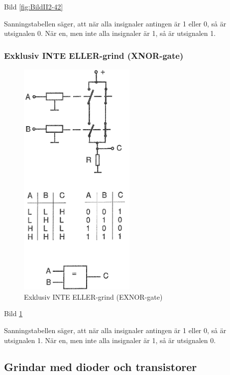 Bild \ref{fig:BildII2-42}

Sanningstabellen säger, att när alla insignaler antingen är 1 eller 0, så är
utsignalen 0. När en, men inte alla insignaler är 1, så är utsignalen 1.

\subsubsection{Exklusiv INTE ELLER-grind (XNOR-gate)}

\begin{figure}
\includegraphics[width=0.5\textwidth]{images/cropped_pdfs/bild_2_2-43.pdf}
\caption{Exklusiv INTE ELLER-grind (EXNOR-gate)}
\label{fig:BildII2-43}
\end{figure}

Bild \ref{fig:BildII2-43}

Sanningstabellen säger, att när alla insignaler antingen är 1 eller 0, så är
utsignalen 1. När en, men inte alla insignaler är 1, så är utsignalen 0.

\subsection{Grindar med dioder och transistorer}

